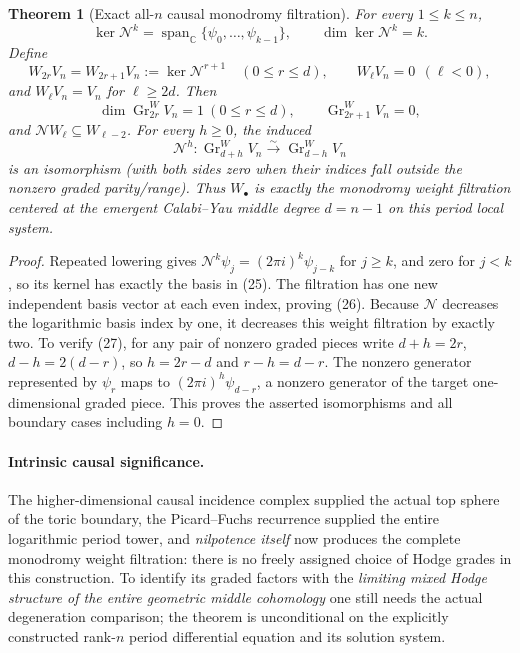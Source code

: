 \documentclass[11pt]{article}
\newtheorem{theorem}{Theorem}
\begin{document}
\begin{theorem}[Exact all-$n$ causal monodromy filtration]
For every $1\le k\le n$,
\[
\boxed{\quad
 \ker\mathcal N^k
 =\operatorname{span}_{\mathbb C}
   \{\psi_0,\ldots,\psi_{k-1}\},
 \qquad \dim\ker\mathcal N^k=k.
\quad}\tag{25}
\]
Define
\[
 W_{2r}V_n=W_{2r+1}V_n
    :=\ker \mathcal N^{r+1}
       \quad (0\le r\le d),
 \qquad W_{\ell}V_n=0\ \ (\ell<0),
\]
and $W_\ell V_n=V_n$ for $\ell\ge2d$.
Then
\[
\boxed{\quad
 \dim\operatorname{Gr}_{2r}^{W}V_n=1
 \ (0\le r\le d),\qquad
 \operatorname{Gr}_{2r+1}^{W}V_n=0,
\quad}\tag{26}
\]
and $\mathcal N W_\ell\subseteq W_{\ell-2}$.
For every $h\ge0$, the induced
\[
\boxed{\quad
\mathcal N^h:
 \operatorname{Gr}_{d+h}^{W}V_n
 \overset{\sim}{\longrightarrow}
 \operatorname{Gr}_{d-h}^{W}V_n
\quad}\tag{27}
\]
is an isomorphism (with both sides zero when their
indices fall outside the nonzero graded parity/range).
Thus $W_\bullet$ is exactly the \emph{monodromy
weight filtration centered at the emergent
Calabi--Yau middle degree $d=n-1$} on this
period local system.
\end{theorem}
\begin{proof}
Repeated lowering gives
$\mathcal N^k\psi_j=(2\pi i)^k\psi_{j-k}$
for $j\ge k$, and zero for $j<k$,
so its kernel has exactly the basis
in (25). The filtration has one new independent
basis vector at each even index, proving (26).
Because $\mathcal N$ decreases the logarithmic
basis index by one, it decreases this weight
filtration by exactly two. To verify (27),
for any pair of nonzero graded pieces write
$d+h=2r$, $d-h=2(d-r)$, so $h=2r-d$ and
$r-h=d-r$. The nonzero generator represented
by $\psi_r$ maps to
$(2\pi i)^h\psi_{d-r}$, a nonzero generator
of the target one-dimensional graded piece.
This proves the asserted isomorphisms and all
boundary cases including $h=0$.
\end{proof}

\paragraph{Intrinsic causal significance.}
The higher-dimensional causal incidence complex
supplied the actual top sphere of the toric boundary,
the Picard--Fuchs recurrence supplied the entire
logarithmic period tower, and \emph{nilpotence itself}
now produces the complete monodromy weight filtration:
there is no freely assigned choice of Hodge grades
in this construction. To identify its graded factors
with the \emph{limiting mixed Hodge structure of the
entire geometric middle cohomology} one still needs
the actual degeneration comparison; the theorem is
unconditional on the explicitly constructed rank-$n$
period differential equation and its solution system.
\end{document}
